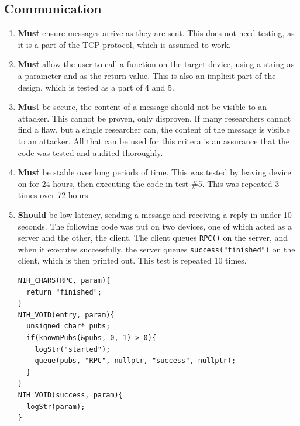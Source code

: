 \documentclass{article}
\begin{document}
\subsection{Communication}
\begin{enumerate}
\item \textbf{Must} ensure messages arrive as they are sent. This does not need testing, as it is a part of the TCP protocol, which is assumed to work.
\item \textbf{Must} allow the user to call a function on the target device, using a
string as a parameter and as the return value. This is also an implicit part of the design, which is tested as a part of 4 and 5.
\item \textbf{Must} be secure, the content of a message should not be visible to
an attacker. This cannot be proven, only disproven. If many researchers cannot find a flaw, but a single researcher can, the content of the message is visible to an attacker. All that can be used for this critera is an assurance that the code was tested and audited thoroughly.
\item \textbf{Must} be stable over long periods of time. This was tested by leaving device on for 24 hours, then executing the code in test \#5. This was repeated 3 times over 72 hours.
\item \textbf{Should} be low-latency, sending a message and receiving a reply in under 10 seconds. The following code was put on two devices, one of which acted as a server and the other, the client. The client queues \texttt{RPC()} on the server, and when it executes successfully, the server queues \texttt{success("finished")} on the client, which is then printed out. This test is repeated 10 times.

\begin{tcolorbox}[colback=white,grow to left by=2.5mm,grow to right by=2.5mm,left*=0mm,right*=0mm,sharp corners]
\begin{verbatim}
NIH_CHARS(RPC, param){
  return "finished";
}
NIH_VOID(entry, param){
  unsigned char* pubs;
  if(knownPubs(&pubs, 0, 1) > 0){
    logStr("started");
    queue(pubs, "RPC", nullptr, "success", nullptr);
  }
}
NIH_VOID(success, param){
  logStr(param);
}
\end{verbatim}
\end{tcolorbox}


\end{enumerate}
\end{document}
